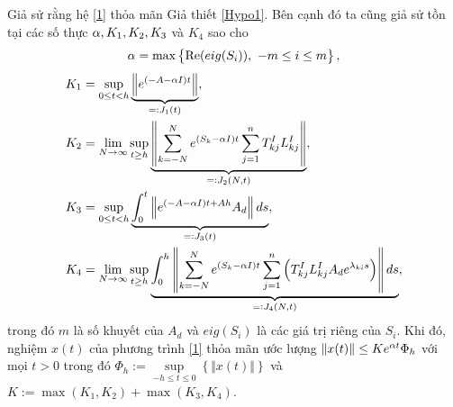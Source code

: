 \begin{dly}\label{dly1}
Giả sử rằng hệ \eqref{1} thỏa mãn Giả thiết \ref{Hypo1}. Bên cạnh đó ta cũng giả sử tồn tại các số thực $\alpha, K_1, K_2, K_3$ và $K_4$ sao cho
\begin{align}\label{17}
 \alpha = \max  \left\{ \mathrm{Re}(eig(S_i)), \ -m\leq i \leq m \right\} , 
\end{align}
\begin{subequations}\label{18}
\begin{align}
	&K_1 = \sup\limits_{0 \le t <h}   \underbrace{\left \Vert e^{(-A - \alpha I)t} \right\Vert}_{=:J_1(t)},\\
 \label{125b}
	&K_2 = \lim\limits_{N \to \infty} \sup\limits_{t \ge h} \underbrace{\left\Vert \sum_{k=-N}^{N} e^{(S_k-\alpha I)t} \sum_{j=1}^{n} T^I_{kj}L^I_{kj} \right\Vert }_{=:J_2(N,t)},    \\
	   &K_3 = \sup \limits_{0 \le t <h}  \underbrace{ \int_0^t \left\Vert e^{(-A-\alpha I)t +A h }A_d \right\Vert ds }_{=:J_3(t)} ,\\
 &K_4 = \lim\limits_{N \to \infty} \sup\limits_{t \ge h} \underbrace{ \int_{0}^{h} \left \Vert \sum_{k=-N}^{N} e^{(S_k-\alpha I)t} \sum_{j =1}^{n} \left(T^I_{kj}L^I_{kj}A_de^{\lambda_{ki}s } \right) \right \Vert ds }_{=:J_4(N,t)},
\end{align}
\end{subequations}
%
trong đó $m$ là số khuyết của $A_d$ và $eig(S_i)$ là các giá trị riêng của $S_i$. 
Khi đó, nghiệm $x(t)$ của phương trình \ref{1} thỏa mãn ước lượng $\Vert x(t) \Vert \le Ke^{\alpha t}\Phi_h$ với mọi $t >0$ trong đó 
$\Phi_h := \sup\limits_{-h \le t \le 0} \left\{\Vert x(t) \Vert \right\} $ và $K := \max (K_1, K_2) + \max(K_3, K_4)$.
\end{dly}
